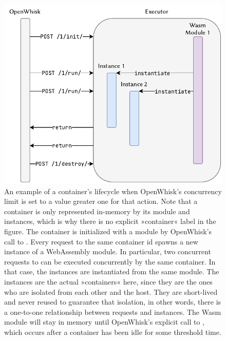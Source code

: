 \begin{figure}
    \centering
    \includegraphics{figures/OpenWhiskConcurrencyLimitGreaterOne.pdf}
    \caption{An example of a container's lifecycle when OpenWhisk's concurrency limit is set to a value greater one for that action. Note that a container is only represented in-memory by its module and instances, which is why there is no explicit »container« label in the figure. The container is initialized with a module by OpenWhisk's call to . Every  request to the same container id spawns a new instance of a WebAssembly module. In particular, two concurrent requests to  can be executed concurrently by the same container. In that case, the instances are instantiated from the same module. The instances are the actual »containers« here, since they are the ones who are isolated from each other and the host. They are short-lived and never reused to guarantee that isolation, in other words, there is a one-to-one relationship between  requests and instances. The Wasm module will stay in memory until OpenWhisk's explicit call to , which occurs after a container has been idle for some threshold time.}
    \label{fig:openwhisk-concurrency-limit-greater-one}
\end{figure}


